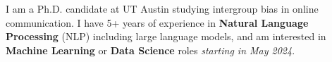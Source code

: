 I am a Ph.D. candidate at UT Austin studying intergroup bias in online communication. I have 5+ years of experience in \textbf{Natural Language Processing} (NLP) including large language models, and am interested in  \textbf{Machine Learning} or \textbf{Data Science} roles \emph{starting in May 2024}.

